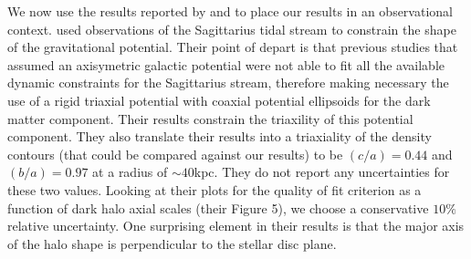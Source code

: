 \documentclass[usenatbib]{mnras}
\begin{document}



We now use the results reported by \cite{LM10} and \cite{Bovy16}
to place our results in an observational context.
\cite{LM10} used observations of the Sagittarius tidal stream to
constrain the shape of the gravitational potential.
Their point of depart is that previous studies that assumed an
axisymetric galactic potential were not able to fit all the available
dynamic constraints for the Sagittarius stream, therefore making
necessary the use of a rigid triaxial potential with coaxial potential
ellipsoids for the dark matter component.  
Their results constrain the triaxility of this potential
component. 
They also translate their results into a triaxiality of the density
contours (that could be compared against our results)
 to be $(c/a)=0.44$ and $(b/a)=0.97$ at a radius of $\sim 40$kpc. 
They do not report any uncertainties for these two values. 
Looking at their plots for the quality of fit criterion as a function
of dark halo axial scales (their Figure 5), we choose a conservative $10\%$
relative uncertainty.
One surprising element in their results is that  the major axis of the
halo shape is perpendicular to the stellar disc plane.  
\end{document}

